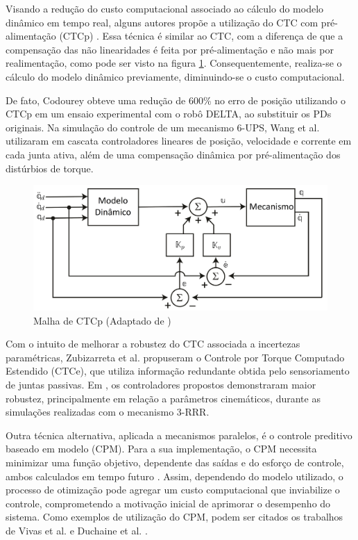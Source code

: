 \documentclass[]{politex}
\begin{document}
Visando a redução do custo computacional associado ao cálculo do modelo dinâmico em tempo real, alguns autores propõe a utilização do CTC com pré-alimentação (CTCp) \cite{Khalil, Siciliano, Spong}. Essa técnica é similar ao CTC, com a diferença de que a compensação das não linearidades é feita por pré-alimentação e não mais por realimentação, como pode ser visto na figura \ref{fig:CTCp}. Consequentemente, realiza-se o cálculo do modelo dinâmico previamente, diminuindo-se o custo computacional.

De fato, Codourey \cite{Codourey} obteve uma redução de 600\% no erro de posição utilizando o CTCp em um ensaio experimental com o robô DELTA, ao substituir os PDs originais. Na simulação do controle de um mecanismo 6-UPS, Wang et al. \cite{Wang} utilizaram em cascata controladores lineares de posição, velocidade e corrente em cada junta ativa, além de  uma compensação dinâmica por pré-alimentação dos distúrbios de torque.

\begin{figure}[h]
	\centering
	\includegraphics[scale=0.385]{../figures/CTCp.jpg}  
	\caption{Malha de CTCp (Adaptado de \cite{Craig})}
	\label{fig:CTCp}
\end{figure}

Com o intuito de melhorar a robustez do CTC associada a incertezas paramétricas, Zubizarreta et al. \cite{Zubizarreta, Zubizarreta2, Zubizarreta3, Zubizarreta4} propuseram  o  Controle por Torque Computado Estendido (CTCe), que utiliza informação redundante obtida pelo sensoriamento de juntas passivas. Em \cite{Zubizarreta}, os controladores propostos demonstraram maior robustez, principalmente em relação a parâmetros cinemáticos, durante as simulações realizadas com o mecanismo 3-RRR.

Outra técnica alternativa, aplicada a mecanismos paralelos, é o controle preditivo baseado em modelo (CPM). Para a sua implementação, o CPM necessita minimizar uma função objetivo, dependente das saídas e do esforço de controle, ambos calculados em tempo futuro \cite{Camacho}. Assim, dependendo do modelo utilizado, o processo de otimização pode agregar um custo computacional que inviabilize o controle, comprometendo a motivação inicial de aprimorar o desempenho do sistema. Como exemplos de utilização do CPM, podem ser citados os trabalhos de Vivas et al. \cite{Vivas} e   Duchaine et al. \cite{Duchaine}.
\end{document}
